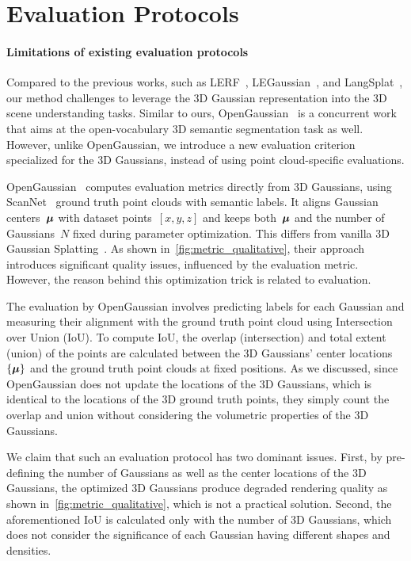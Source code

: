 \section{Evaluation Protocols}
\label{metric}

\paragraph{Limitations of existing evaluation protocols}
Compared to the previous works, such as LERF~\cite{lerf}, LEGaussian~\cite{legaussian}, and LangSplat~\cite{langsplat}, our method challenges to leverage the 3D Gaussian representation into the 3D scene understanding tasks. Similar to ours, OpenGaussian~\cite{open_gaussian} is a concurrent work that aims at the open-vocabulary 3D semantic segmentation task as well. However, unlike OpenGaussian, we introduce a new evaluation criterion specialized for the 3D Gaussians, instead of using point cloud-specific evaluations.

OpenGaussian~\cite{open_gaussian} computes evaluation metrics directly from 3D Gaussians, using ScanNet~\cite{dai2017scannet} ground truth point clouds with semantic labels. It aligns Gaussian centers~${ \mbox{\boldmath $\mu$} }$ with dataset points~${ [x,y,z] }$ and keeps both~${ \mbox{\boldmath $\mu$} }$ and the number of Gaussians~$N$ fixed during parameter optimization. This differs from vanilla 3D Gaussian Splatting~\cite{3dgs}. As shown in~\cref{fig:metric_qualitative}, their approach introduces significant quality issues, influenced by the evaluation metric. However, the reason behind this optimization trick is related to evaluation.

The evaluation by OpenGaussian involves predicting labels for each Gaussian and measuring their alignment with the ground truth point cloud using Intersection over Union (IoU). To compute IoU, the overlap (intersection) and total extent (union) of the points are calculated between the 3D Gaussians' center locations~$\{ \mbox{\boldmath $\mu$} \}$ and the ground truth point clouds at fixed positions. As we discussed, since OpenGaussian does not update the locations of the 3D Gaussians, which is identical to the locations of the 3D ground truth points, they simply count the overlap and union without considering the volumetric properties of the 3D Gaussians.

We claim that such an evaluation protocol has two dominant issues. 
First, by pre-defining the number of Gaussians as well as the center locations of the 3D Gaussians, the optimized 3D Gaussians produce degraded rendering quality as shown in~\cref{fig:metric_qualitative}, which is not a practical solution. 
Second, the aforementioned IoU is calculated only with the number of 3D Gaussians, which does not consider the significance of each Gaussian having different shapes and densities.

